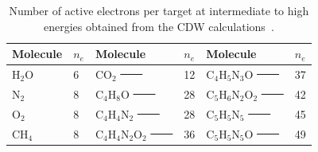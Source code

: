 \documentclass[10pt,showpacs,showkeys,twocolumn]{revtex4-1} %
\providecommand{\DIFdel}[1]{{\protect\color{red}\sout{#1}}}                      %
\providecommand{\DIFdelbegin}{} %
\providecommand{\DIFdelFL}[1]{\DIFdel{#1}} %
\providecommand{\DIFaddbeginFL}{} %
\providecommand{\DIFaddendFL}{} %
\providecommand{\DIFdelbeginFL}{} %
\providecommand{\DIFdelendFL}{} %
\newcommand{\DIFscaledelfig}{0.5}
\newlength{\DIFdelgraphicswidth} %
\newlength{\DIFdelgraphicsheight} %
\newcommand{\DIFaddincludegraphics}[2][]{{\color{blue}\fbox{\DIFOincludegraphics[#1]{#2}}}} %
\newcommand{\DIFdelincludegraphics}[2][]{%
\sbox{\DIFdelgraphicsbox}{\DIFOincludegraphics[#1]{#2}}%
\settoboxwidth{\DIFdelgraphicswidth}{\DIFdelgraphicsbox} %
\settoboxtotalheight{\DIFdelgraphicsheight}{\DIFdelgraphicsbox} %
\scalebox{\DIFscaledelfig}{%
\parbox[b]{\DIFdelgraphicswidth}{\usebox{\DIFdelgraphicsbox}\\[-\baselineskip] \rule{\DIFdelgraphicswidth}{0em}}\llap{\resizebox{\DIFdelgraphicswidth}{\DIFdelgraphicsheight}{%
\setlength{\unitlength}{\DIFdelgraphicswidth}%
\begin{picture}(1,1)%
\thicklines\linethickness{2pt} %
{\color[rgb]{1,0,0}\put(0,0){\framebox(1,1){}}}%
{\color[rgb]{1,0,0}\put(0,0){\line( 1,1){1}}}%
{\color[rgb]{1,0,0}\put(0,1){\line(1,-1){1}}}%
\end{picture}%
}\hspace*{3pt}}} %
} %
\DeclareRobustCommand{\DIFdelbegin}{\DIFOdelbegin \let\includegraphics\DIFdelincludegraphics} %
\DeclareRobustCommand{\DIFaddbeginFL}{\DIFOaddbeginFL \let\includegraphics\DIFaddincludegraphics} %
\DeclareRobustCommand{\DIFaddendFL}{\DIFOaddendFL \let\includegraphics\DIFOincludegraphics} %
\DeclareRobustCommand{\DIFdelbeginFL}{\DIFOdelbeginFL \let\includegraphics\DIFdelincludegraphics} %
\DeclareRobustCommand{\DIFdelendFL}{\DIFOaddendFL \let\includegraphics\DIFOincludegraphics} %
\begin{document}
\DIFdelbegin %
\DIFdelendFL \DIFaddbeginFL \begin{table}[t]
\DIFaddendFL \begin{center}
\begin{tabular}{|ll|ll|ll|}
\hline
 Molecule & $n_e$ & Molecule          & $n_e$ & Molecule          & $n_e$ \\
\hline
 H$_2$O   & 6  & CO$_2$               \DIFdelbeginFL \DIFdelFL{\ \ \ \ }\DIFdelendFL & 12 & C$_4$H$_5$N$_3$O     \DIFdelbeginFL \DIFdelFL{\ \ \ \ }\DIFdelendFL & 37   \\ 
 N$_2$    & 8  & C$_4$H$_8$O          \DIFdelbeginFL \DIFdelFL{\ \ \ \ }\DIFdelendFL & 28 & C$_5$H$_6$N$_2$O$_2$ \DIFdelbeginFL \DIFdelFL{\ \ \ \ }\DIFdelendFL & 42   \\ 
 O$_2$    & 8  & C$_4$H$_4$N$_2$      \DIFdelbeginFL \DIFdelFL{\ \ \ \  }\DIFdelendFL & 28 & C$_5$H$_5$N$_5$      \DIFdelbeginFL \DIFdelFL{\ \ \ \ }\DIFdelendFL & 45   \\ 
 CH$_4$   & 8  & C$_4$H$_4$N$_2$O$_2$ \DIFdelbeginFL \DIFdelFL{\ \ \ \ }\DIFdelendFL & 36 & C$_5$H$_5$N$_5$O     \DIFdelbeginFL \DIFdelFL{\ \ \ \ }\DIFdelendFL & 49   \\ 
 \hline
\end{tabular}
\caption{Number of active electrons per target at intermediate to high 
energies obtained from the CDW calculations~\cite{MendezJPB20}.}
\label{nn}
\end{center}
\end{table}
\end{document}
